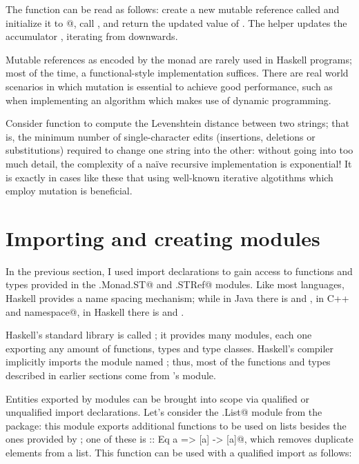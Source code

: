 \documentclass[UdineBachThesis,american,11pt]{PhdThesis}
\begin{document}
  The function \lstinline@factorialST@ can be read as follows: create a new
  mutable reference called \lstinline@accRef@ and initialize it to
  @, call \lstinline@go@, and return the updated value of
  \lstinline@accRef@. The helper \lstinline@go@ updates the accumulator
  \lstinline@accRef@, iterating from \lstinline@n@ downwards.

  Mutable references as encoded by the \lstinline@ST@ monad are rarely used in
  Haskell programs; most of the time, a functional-style implementation
  suffices. There are real world scenarios in which mutation is essential to
  achieve good performance, such as when implementing an algorithm which makes
  use of dynamic programming.

  Consider function to compute the Levenshtein distance between two strings;
  that is, the minimum number of single-character edits (insertions, deletions
  or substitutions) required to change one string into the other: without going
  into too much detail, the complexity of a na\"ive recursive implementation is
  exponential! It is exactly in cases like these that using well-known iterative
  algotithms which employ mutation is beneficial.

  \section{Importing and creating modules}

  In the previous section, I used import declarations to gain access to
  functions and types provided in the \lstinline@Control.Monad.ST@ and
  \lstinline@Data.STRef@ modules. Like most languages, Haskell provides a name
  spacing mechanism; while in Java there is \lstinline@package@ and
  \lstinline@import@, in C++ \lstinline@namespace@ and
  \lstinline@using namespace@, in Haskell there is \lstinline@module@ and
  \lstinline@import@.

  Haskell's standard library is called \lstinline@base@; it provides many
  modules, each one exporting any amount of functions, types and type classes.
  Haskell's compiler implicitly imports the module named \lstinline@Prelude@;
  thus, most of the functions and types described in earlier sections come from
  \lstinline@base@'s \lstinline@Prelude@ module.

  Entities exported by modules can be brought into scope via qualified or
  unqualified import declarations. Let's consider the \lstinline@Data.List@
  module from the \lstinline@base@ package: this module exports additional
  functions to be used on lists besides the ones provided by
  \lstinline@Prelude@; one of these is \lstinline@nub :: Eq a => [a] -> [a]@,
  which removes duplicate elements from a list. This function can be used with a
  qualified import as follows:
\end{document}
